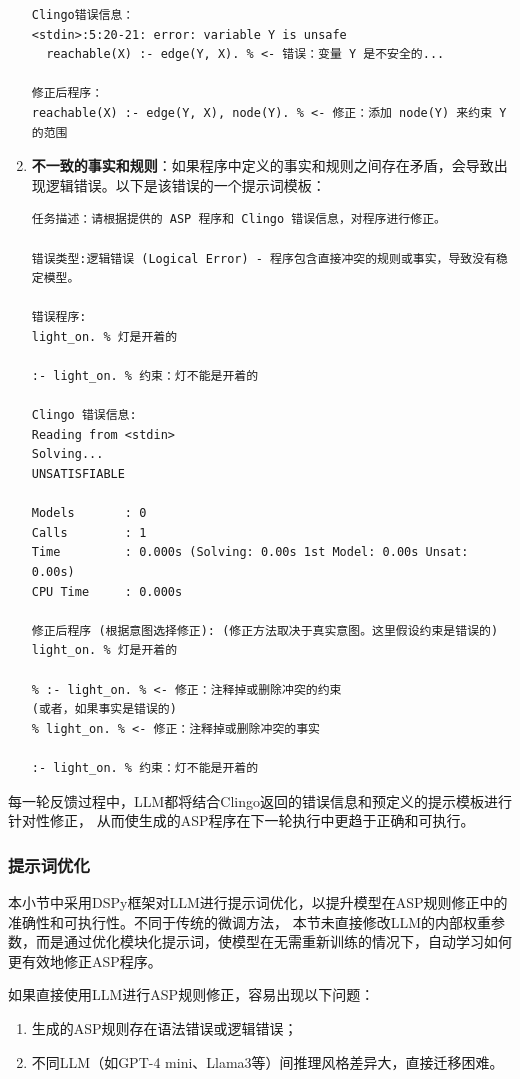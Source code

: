 \begin{enumerate}[nosep]
\begin{lstlisting}
Clingo错误信息：
<stdin>:5:20-21: error: variable Y is unsafe
  reachable(X) :- edge(Y, X). % <- 错误：变量 Y 是不安全的...

修正后程序：
reachable(X) :- edge(Y, X), node(Y). % <- 修正：添加 node(Y) 来约束 Y 的范围
\end{lstlisting}
\item \textbf{不一致的事实和规则}：如果程序中定义的事实和规则之间存在矛盾，会导致出现逻辑错误。以下是该错误的一个提示词模板：
\begin{lstlisting}
任务描述：请根据提供的 ASP 程序和 Clingo 错误信息，对程序进行修正。

错误类型:逻辑错误 (Logical Error) - 程序包含直接冲突的规则或事实，导致没有稳定模型。

错误程序:
light_on. % 灯是开着的

:- light_on. % 约束：灯不能是开着的

Clingo 错误信息:
Reading from <stdin>
Solving...
UNSATISFIABLE

Models       : 0
Calls        : 1
Time         : 0.000s (Solving: 0.00s 1st Model: 0.00s Unsat: 0.00s)
CPU Time     : 0.000s

修正后程序 (根据意图选择修正): (修正方法取决于真实意图。这里假设约束是错误的)
light_on. % 灯是开着的

% :- light_on. % <- 修正：注释掉或删除冲突的约束
(或者，如果事实是错误的)
% light_on. % <- 修正：注释掉或删除冲突的事实

:- light_on. % 约束：灯不能是开着的
\end{lstlisting}
\end{enumerate}
每一轮反馈过程中，LLM都将结合Clingo返回的错误信息和预定义的提示模板进行针对性修正，
从而使生成的ASP程序在下一轮执行中更趋于正确和可执行。

\subsubsection{提示词优化}
本小节中采用DSPy框架对LLM进行提示词优化，以提升模型在ASP规则修正中的准确性和可执行性。不同于传统的微调方法，
本节未直接修改LLM的内部权重参数，而是通过优化模块化提示词，使模型在无需重新训练的情况下，自动学习如何更有效地修正ASP程序。

如果直接使用LLM进行ASP规则修正，容易出现以下问题：
\begin{enumerate}[nosep]
\item 生成的ASP规则存在语法错误或逻辑错误；
\item 不同LLM（如GPT-4 mini、Llama3等）间推理风格差异大，直接迁移困难。
\end{enumerate}

